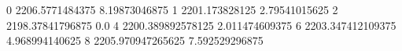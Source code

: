 0 2206.5771484375 8.19873046875
1 2201.173828125 2.79541015625
2 2198.37841796875 0.0
4 2200.389892578125 2.011474609375
6 2203.347412109375 4.968994140625
8 2205.970947265625 7.592529296875
